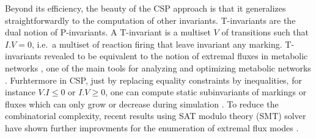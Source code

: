 \documentclass[graybox]{svmult}
\begin{document}
Beyond its efficiency, the beauty of the CSP approach is that it generalizes straightforwardly to the computation of other invariants.
T-invariants are the dual notion of P-invariants.
A T-invariant is a multiset $V$ of transitions such that $I.V=0$, i.e.~a multiset of reaction firing that leave invariant any marking.
T-invariants revealed to be equivalent to the notion of extremal fluxes in metabolic networks \cite{KS06bi,ZS03insilicobio,VP94nb},
one of the main tools for analyzing and optimizing metabolic networks \cite{RFBPPWSBP11bi,LB09dam,FSKF09bi,Herrgard08nbt}.
Furhtermore in CSP, just by replacing equality constraints by inequalities, for instance $V.I\le 0$ or $I.V\ge 0$, one can compute 
static subinvariants of markings or fluxes which can only grow or decrease during simulation \cite{Soliman12amb}.
To reduce the combinatorial complexity,
recent results using SAT modulo theory (SMT) solver have shown further improvments for the enumeration of extremal flux modes \cite{PMS14cmsb}.


\end{document}
